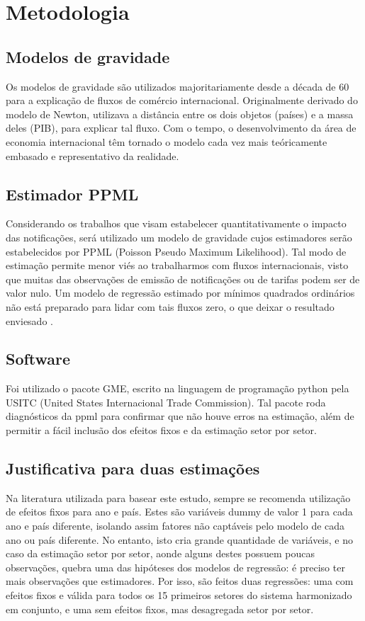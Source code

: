 \documentclass[12pt, a4paper]{article}
\begin{document}
\section{Metodologia}
\subsection{Modelos de gravidade}

Os modelos de gravidade são utilizados majoritariamente desde a década de 60 para a explicação de fluxos de comércio internacional. Originalmente derivado do modelo de Newton, utilizava a distância entre os dois objetos (países) e a massa deles (PIB), para explicar tal fluxo. Com o tempo, o desenvolvimento da área de economia internacional têm tornado o modelo cada vez mais teóricamente embasado e representativo da realidade. \cite{nascimento2013evoluccao}

\subsection{Estimador PPML}
Considerando os trabalhos que visam estabelecer quantitativamente o impacto das notificações, será utilizado um modelo de gravidade cujos estimadores serão estabelecidos por PPML (Poisson Pseudo Maximum Likelihood). Tal modo de estimação permite menor viés ao trabalharmos com fluxos internacionais, visto que muitas das observações de emissão de notificações ou de tarifas podem ser de valor nulo. Um modelo de regressão estimado por mínimos quadrados ordinários não está preparado para lidar com tais fluxos zero, o que deixar o resultado enviesado \cite{Log_Of_Gravity}.

\subsection{Software}
Foi utilizado o pacote GME, escrito na linguagem de programação python pela USITC (United States Internacional Trade Commission). Tal pacote roda diagnósticos da ppml para confirmar que não houve erros na estimação, além de permitir a fácil inclusão dos efeitos fixos e da estimação setor por setor.

\subsection{Justificativa para duas estimações}

Na literatura utilizada para basear este estudo, sempre se recomenda utilização de efeitos fixos para ano e país. Estes são variáveis dummy de valor 1 para cada ano e país diferente, isolando assim fatores não captáveis pelo modelo de cada ano ou país diferente. No entanto, isto cria grande quantidade de variáveis, e no caso da estimação setor por setor, aonde alguns destes possuem poucas observações, quebra uma das hipóteses dos modelos de regressão: é preciso ter mais observações que estimadores. Por isso, são feitos duas regressões: uma com efeitos fixos e válida para todos os 15 primeiros setores do sistema harmonizado em conjunto, e uma sem efeitos fixos, mas desagregada setor por setor.
\end{document}
